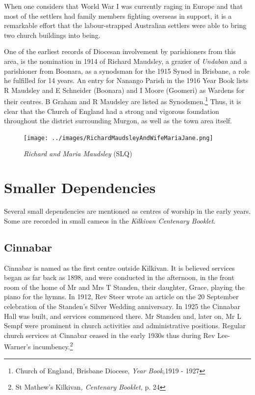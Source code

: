 When one considers that World War I was currently raging in Europe and that most of the settlers had family members fighting overseas in support, it is a remarkable effort that the labour-strapped Australian settlers were able to bring two church buildings into being.



One of the earliest records of Diocesan involvement by parishioners from this area, is the nomination in 1914 of Richard Maudsley, a grazier of \emph{Undaban} and a parishioner from Boonara, as a synodsman for the 1915 Synod in Brisbane, a role he fulfilled for 14 years. An entry for Nanango Parish in the 1916 Year Book lists R Maudsley and E Schneider (Boonara) and I Moore (Goomeri) as Wardens for their centres. B Graham and R Maudsley are listed as Synodsmen.\footnote{Church of England, Brisbane Diocese, \emph{Year Book,}1919 - 1927} Thus, it is clear that the Church of England had a strong and vigorous foundation throughout the district surrounding Murgon, as well as the town area itself.








\begin{figure}
\begin{center}
\texttt{[image: ../images/RichardMaudsleyAndWifeMariaJane.png]}
\caption{{\itshape Richard and Maria Maudsley} {\scriptsize(SLQ)}}
\end{center}
\end{figure}




\section{Smaller Dependencies}



Several small dependencies are mentioned as centres of worship in the early years. Some are recorded in small cameos in the \emph{Kilkivan Centenary Booklet}.



\subsection{Cinnabar}



Cinnabar is named as the first centre outside Kilkivan. It is believed services began as far back as 1898, and were conducted in the afternoon, in the front room of the home of Mr and Mrs T Standen, their daughter, Grace, playing the piano for the hymns. In 1912, Rev Steer wrote an article on the 20 September celebration of the Standen's Silver Wedding anniversary. In 1925 the Cinnabar Hall was built, and services commenced there. Mr Standen and, later on, Mr L Sempf were prominent in church activities and administrative positions. Regular church services at Cinnabar ceased in the early 1930s thus during Rev Lee-Warner's incumbency.\footnote{St Mathew's Kilkivan\emph{, Centenary Booklet,} p. 24}


